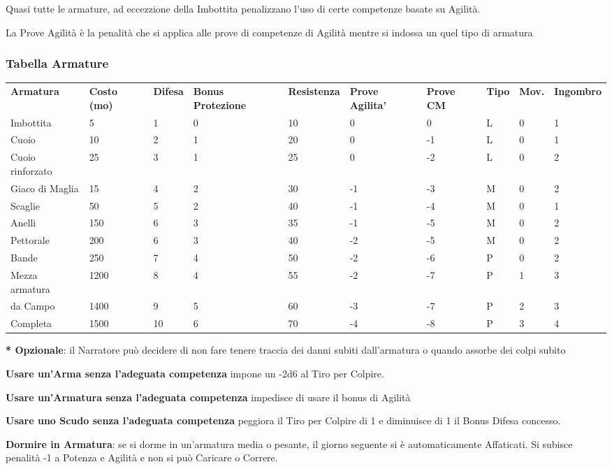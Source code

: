 \documentclass[a4paper,11pt,twoside,openany]{book}
\begin{document}
{Quasi tutte le armature, ad eccezzione della Imbottita penalizzano l'uso di certe competenze basate su Agilità. 

La Prove Agilità è la penalità che si applica alle prove di competenze di Agilità mentre si indossa un quel tipo di armatura 

\subsubsection{Tabella Armature}
\medskip

\label{tabella-armature}
\begin{tabular}{L{2cm} L{1.7cm} L{1.3cm} L{2cm} L{1.3cm} L{1.5cm} L{1.5cm}L{1cm}L{1cm}L{2cm}} 
\toprule
\textbf{Armatura} &\textbf{Costo (mo)} & \textbf{Difesa} & \textbf{Bonus Protezione }& \textbf{Resistenza} & \textbf{Prove Agilita’} & \textbf{Prove CM} & \textbf{Tipo} & \textbf{Mov.} & \textbf{Ingombro}\tabularnewline
Imbottita & 5 & 1 & 0 & 10 & 0 & 0 & L & 0 & 1\tabularnewline
Cuoio & 10 & 2 & 1 & 20 & 0 & -1 & L & 0 & 1\tabularnewline
Cuoio rinforzato & 25 & 3 & 1 & 25 & 0 & -2 & L & 0 & 2\tabularnewline
Giaco di Maglia & 15 & 4 & 2 & 30 & -1 & -3 & M & 0 & 2\tabularnewline
Scaglie & 50 & 5 & 2 & 40 & -1 & -4 & M & 0 & 1\tabularnewline
Anelli & 150 & 6 & 3 & 35 & -1 & -5 & M & 0 & 2\tabularnewline
Pettorale & 200 & 6 & 3 & 40 & -2 & -5 & M & 0 & 2\tabularnewline
Bande & 250 & 7 & 4 & 50 & -2 & -6 & P & 0 & 2\tabularnewline
Mezza armatura & 1200 & 8 & 4 & 55 & -2 & -7 & P & 1 & 3\tabularnewline
da Campo & 1400 & 9 & 5 & 60 & -3 & -7 & P & 2 & 3\tabularnewline
Completa & 1500 & 10 & 6 & 70 & -4 & -8 & P & 3 & 4\tabularnewline
\end{tabular}

\textbf{{*} Opzionale}: il Narratore può decidere di non fare tenere traccia dei danni subiti dall'armatura o quando assorbe dei colpi subito

\bigskip

\textbf{Usare un'Arma senza l'adeguata competenza} impone un -2d6 al Tiro per Colpire.

\textbf{Usare un'Armatura senza l'adeguata competenza} impedisce di usare il bonus di Agilità

\textbf{Usare uno Scudo senza l'adeguata competenza} peggiora il Tiro per Colpire di 1 e diminuisce di 1 il Bonus Difesa concesso.

\textbf{Dormire in Armatura}: se si dorme in un'armatura media o pesante, il giorno seguente si è automaticamente Affaticati. Si subisce penalità -1 a Potenza e Agilità e non si può Caricare o Correre.

}
\end{document}
